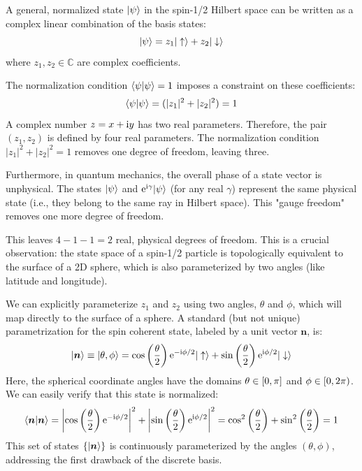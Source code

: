 A general, normalized state $|\psi\rangle$ in the spin-1/2 Hilbert space can be written as a complex linear combination of the basis states:
\begin{equation}
    |\psi\rangle = z_1 |\uparrow\rangle + z_2 |\downarrow\rangle
\end{equation}
where $z_1, z_2 \in \mathbb{C}$ are complex coefficients.

The normalization condition $\langle\psi|\psi\rangle = 1$ imposes a constraint on these coefficients:
\begin{equation}
    \langle\psi|\psi\rangle = (|z_1|^2 + |z_2|^2) = 1
\end{equation}
A complex number $z = x + \mathrm{i} y$ has two real parameters. Therefore, the pair $(z_1, z_2)$ is defined by four real parameters. The normalization condition $|z_1|^2 + |z_2|^2 = 1$ removes one degree of freedom, leaving three.

Furthermore, in quantum mechanics, the overall phase of a state vector is unphysical. The states $|\psi\rangle$ and $\mathrm{e}^{\mathrm{i}\gamma} |\psi\rangle$ (for any real $\gamma$) represent the same physical state (i.e., they belong to the same ray in Hilbert space). This "gauge freedom" removes one more degree of freedom.

This leaves $4 - 1 - 1 = 2$ real, physical degrees of freedom. This is a crucial observation: the state space of a spin-1/2 particle is topologically equivalent to the surface of a 2D sphere, which is also parameterized by two angles (like latitude and longitude).

We can explicitly parameterize $z_1$ and $z_2$ using two angles, $\theta$ and $\phi$, which will map directly to the surface of a sphere. A standard (but not unique) parametrization for the spin coherent state, labeled by a unit vector $\bm{n}$, is:
\begin{equation}
    |\bm{n}\rangle \equiv |\theta, \phi\rangle = \cos\left(\frac{\theta}{2}\right) \mathrm{e}^{-\mathrm{i}\phi/2} |\uparrow\rangle + \sin\left(\frac{\theta}{2}\right) \mathrm{e}^{\mathrm{i}\phi/2} |\downarrow\rangle
    \label{eq:coherent_state}
\end{equation}
Here, the spherical coordinate angles have the domains $\theta \in [0, \mathrm{\pi}]$ and $\phi \in [0, 2\mathrm{\pi})$. We can easily verify that this state is normalized:
\begin{equation}
    \langle\bm{n}|\bm{n}\rangle = \left|\cos\left(\frac{\theta}{2}\right) \mathrm{e}^{-\mathrm{i}\phi/2}\right|^2 + \left|\sin\left(\frac{\theta}{2}\right) \mathrm{e}^{\mathrm{i}\phi/2}\right|^2 = \cos^2\left(\frac{\theta}{2}\right) + \sin^2\left(\frac{\theta}{2}\right) = 1
\end{equation}
This set of states $\{|\bm{n}\rangle\}$ is continuously parameterized by the angles $(\theta, \phi)$, addressing the first drawback of the discrete basis.

